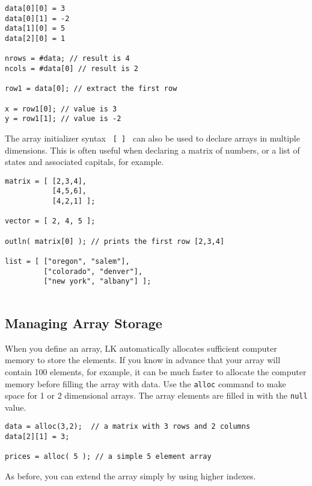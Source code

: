 \documentclass{article}
\begin{document}
\begin{verbatim}
data[0][0] = 3
data[0][1] = -2
data[1][0] = 5
data[2][0] = 1

nrows = #data; // result is 4
ncols = #data[0] // result is 2

row1 = data[0]; // extract the first row

x = row1[0]; // value is 3
y = row1[1]; // value is -2
\end{verbatim}

The array initializer syntax \texttt{ [ ] } can also be used to declare arrays in multiple dimensions.  This is often useful when declaring a matrix of numbers, or a list of states and associated capitals, for example.

\begin{verbatim}
matrix = [ [2,3,4],
           [4,5,6],
           [4,2,1] ];

vector = [ 2, 4, 5 ];

outln( matrix[0] ); // prints the first row [2,3,4]

list = [ ["oregon", "salem"],
         ["colorado", "denver"],
         ["new york", "albany"] ];
         
\end{verbatim}

\subsection{Managing Array Storage}

When you define an array, LK automatically allocates sufficient computer memory to store the elements.  If you know in advance that your array will contain 100 elements, for example, it can be much faster to allocate the computer memory before filling the array with data.  Use the \texttt{alloc} command to make space for 1 or 2 dimensional arrays.  The array elements are filled in with the \texttt{null} value.

\begin{verbatim}
data = alloc(3,2);  // a matrix with 3 rows and 2 columns
data[2][1] = 3;

prices = alloc( 5 ); // a simple 5 element array
\end{verbatim}

As before, you can extend the array simply by using higher indexes.
\end{document}
